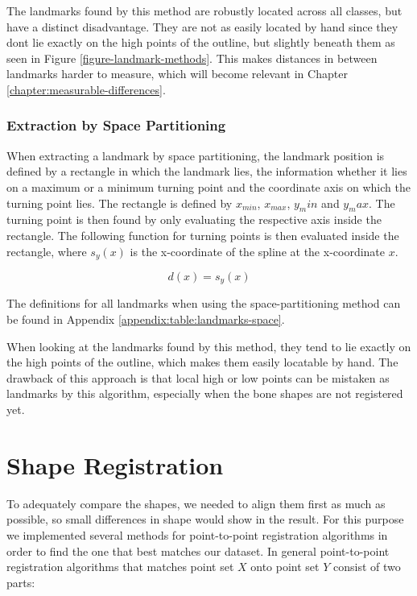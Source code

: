 \documentclass[pdftex,12pt,a4paper]{report}
\begin{document}
The landmarks found by this method are robustly located across all classes, but have a distinct disadvantage. They are
not as easily located by hand since they dont lie exactly on the high points of the outline, but slightly beneath
them  as seen in Figure \ref{figure-landmark-methods}. This makes distances in between landmarks harder to measure, which
will become relevant in Chapter \ref{chapter:measurable-differences}.

\subsubsection{Extraction by Space Partitioning}

When extracting a landmark by space partitioning, the landmark position is defined by a rectangle in which the landmark
lies, the information whether it lies on a maximum or a minimum turning point and the coordinate axis on which the
turning point lies. The rectangle is defined by $x_{min}$, $x_{max}$, $y_min$ and $y_max$. The turning point
is then found by only evaluating the respective axis inside the rectangle. The following function for turning points
is then evaluated inside the rectangle, where $s_y(x)$ is the x-coordinate of the spline at the x-coordinate $x$.

\begin{equation}
d(x) = s_y(x)
\end{equation}

The definitions for all landmarks when using the space-partitioning method can be found in Appendix
\ref{appendix:table:landmarks-space}.

When looking at the landmarks found by this method, they tend to lie exactly on the high points of the outline, which
makes them easily locatable by hand. The drawback of this approach is that local high or low points can be mistaken as
landmarks by this algorithm, especially when the bone shapes are not registered yet.

\section{Shape Registration}

To adequately compare the shapes, we needed to align them first as much as possible, so small differences in shape would
show in the result. For this purpose we implemented several methods for point-to-point registration algorithms in order
to find the one that best matches our dataset. In general point-to-point registration algorithms that matches point set
$X$ onto point set $Y$ consist of two parts:
\end{document}
